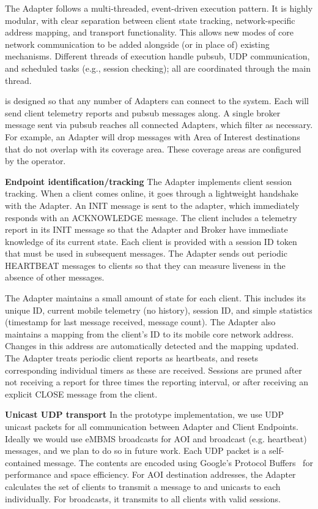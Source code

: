 The \name{} Adapter follows a multi-threaded, event-driven execution
pattern. It is highly modular, with clear separation between client
state tracking, network-specific address mapping, and transport
functionality.  This allows new modes of core network communication to
be added alongside (or in place of) existing mechanisms.  Different
threads of execution handle pubsub, UDP communication, and scheduled
tasks (e.g., session checking); all are coordinated through the main
thread.

\name{} is designed so that any number of Adapters can connect to the
\pubsub{} system. Each will send client telemetry reports and pubsub
messages along. A single broker message sent via pubsub reaches all
connected Adapters, which filter as necessary. For example, an Adapter
will drop messages with Area of Interest destinations that do not
overlap with its coverage area. These coverage areas are configured by
the operator.
  
\textbf{Endpoint identification/tracking} The Adapter implements
client session tracking. When a client comes online, it goes through a
lightweight handshake with the Adapter. An INIT message is sent to the
adapter, which immediately responds with an ACKNOWLEDGE message. The
client includes a telemetry report in its INIT message so that the
Adapter and Broker have immediate knowledge of its current state. Each
client is provided with a session ID token that must be used in
subsequent messages.  The Adapter sends out periodic HEARTBEAT
messages to clients so that they can measure liveness in the absence
of other messages.

The Adapter maintains a small amount of state for each client. This
includes its unique ID, current mobile telemetry (no history), session
ID, and simple statistics (timestamp for last message received,
message count). The Adapter also maintains a mapping from the client's
ID to its mobile core network address. Changes in this address are
automatically detected and the mapping updated. The Adapter treats
periodic client reports as heartbeats, and resets corresponding
individual timers as these are received. Sessions are pruned after not
receiving a report for three times the reporting interval, or after
receiving an explicit CLOSE message from the client.

\textbf{Unicast UDP transport} In the prototype implementation, we use
UDP unicast packets for all communication between Adapter and Client
Endpoints. Ideally we would use eMBMS broadcasts for AOI and broadcast
(e.g. heartbeat) messages, and we plan to do so in future work. Each
UDP packet is a self-contained \name{} message. The contents are
encoded using Google's Protocol Buffers~\cite{buffers2011google} for
performance and space efficiency. For AOI destination addresses, the
Adapter calculates the set of clients to transmit a message to and
unicasts to each individually. For broadcasts, it transmits to all
clients with valid sessions.

